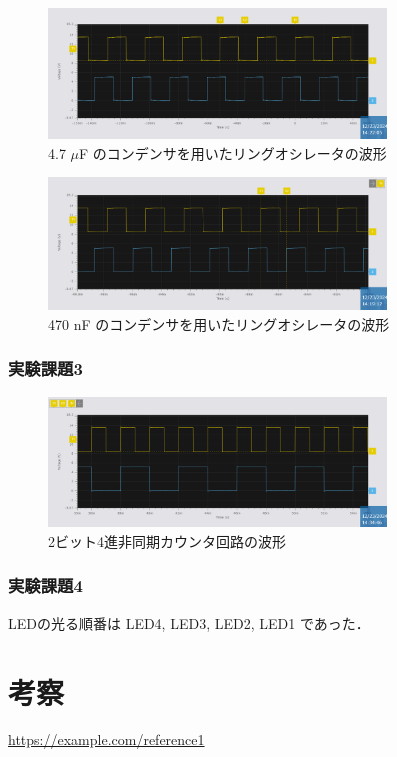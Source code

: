 \documentclass{ltjsarticle}
\begin{document}
\begin{figure}[H]
  \centering
  \includegraphics[width=0.8\textwidth]{figs/2-4700nF.png}
  \caption{4.7 $\mu$F のコンデンサを用いたリングオシレータの波形}
  \label{fig:experiment_results}
\end{figure}

\begin{figure}[H]
  \centering
  \includegraphics[width=0.8\textwidth]{figs/2-470nF.png}
  \caption{470 nF のコンデンサを用いたリングオシレータの波形}
  \label{fig:experiment_results}
\end{figure}

\subsubsection{実験課題3}
\begin{figure}[H]
  \centering
  \includegraphics[width=0.8\textwidth]{figs/3-flipflop.png}
  \caption{2ビット4進非同期カウンタ回路の波形}
  \label{fig:experiment_results}
\end{figure}

\subsubsection{実験課題4}
LEDの光る順番は LED4, LED3, LED2, LED1 であった．

\section{考察}

\begin{thebibliography}{9}
 \url{https://example.com/reference1}
\end{thebibliography}
\end{document}
